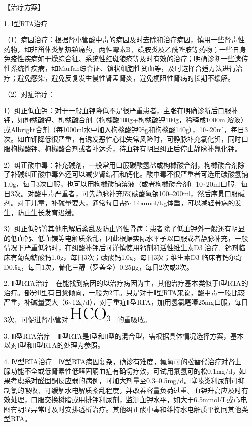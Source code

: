 【治疗方案】

1. Ⅰ型RTA治疗

（1）病因治疗：根据肾小管酸中毒的病因及时去除和治疗病因，慎用一些肾毒性药物，如非甾体类解热镇痛药，两性霉素B，磺胺类及乙酰唑胺等药物；一些自身免疫性疾病如干燥综合征、系统性红斑狼疮等及时有效的治疗；明确诊断一些遗传性系统性疾病，如Marfan综合征、镰状细胞性贫血等，及时选择合适方法进行治疗；避免感染，避免反复发生慢性肾盂肾炎，避免梗阻性肾病的长期不缓解。

（2）对症治疗：

1）纠正低血钾：对于一般血钾降低不是很严重患者，主张在明确诊断后口服补钾，如枸橼酸钾、枸橼酸合剂（枸橼酸100g+枸橼酸钾100g，稀释成1000ml溶液）或Albright合剂（每1000ml水中加入枸橼酸钾98g和枸橼酸140g），10\textasciitilde{}20ml，每日3次。如血钾降低很严重，有诱发恶性心律失常风险时，可静脉补充氯化钾，同时口服枸橼酸钾、枸橼酸合剂或者补达秀，待血钾有明显纠正后停止静脉补氯化钾。

2）纠正酸中毒：补充碱剂，一般常用口服碳酸氢盐或枸橼酸合剂，枸橼酸合剂除了补碱纠正酸中毒外还可以减少肾结石和钙化。酸中毒不很严重者可选用碳酸氢钠1.0g，每日3次口服，也可以用枸橼酸钠溶液（或者枸橼酸合剂）10\textasciitilde{}20ml口服，每日3次。对酸中毒严重者，可先静脉补充5\%碳酸氢钠100\textasciitilde{}200ml，然后序贯口服碱剂。对于儿童，补碱量要大，通常每日需5\textasciitilde{}14mmol/kg体重，可以减轻骨病的发生，防止生长发育迟缓。

3）纠正低钙等其他电解质紊乱及防止肾性骨病：患者除了低血钾外一般还有明显的低血钙、低血镁等电解质紊乱，因此根据实际水平予以口服或者静脉补充，一般情况下严重低钙时，在纠酸补钾后可谨慎使用钙剂和活性维生素D{3}
治疗。钙剂临床有葡萄糖酸钙1.0g，每日3次；碳酸钙1.0g，每日3次；维生素D{3}
临床有钙尔奇D0.6g，每日1次，骨化三醇（罗盖全）0.25μg，每日2次或3次。

2.
Ⅱ型RTA治疗　在能找到病因的以治疗病因为主，其他治疗基本类似于Ⅰ型RTA的治疗。部分Ⅱ型有自愈倾向，一般为2年。只是对于Ⅱ型RTA来说，酸中毒一般比较严重，补碱量要大（6\textasciitilde{}12g/d），对于重症Ⅱ型RTA，加用氢氯噻嗪25mg口服，每日3次，可促进肾小管对\includegraphics{./images/Image00128.jpg}
的重吸收。

3.
Ⅲ型RTA治疗　Ⅲ型RTA是Ⅰ型和Ⅱ型的混合型，需根据具体情况选择方案，基本以对Ⅰ型和Ⅱ型RTA的处理为参照。

4.
Ⅳ型RTA治疗　Ⅳ型RTA病因复杂，确诊有难度，氟氢可的松替代治疗对肾上腺功能不全或低肾素性低醛固酮血症有确切疗效，可试用氟氢可的松0.1mg/d，如果考虑系对醛固酮反应弱的病例，可加大剂量至0.3\textasciitilde{}0.5mg/d。噻嗪类利尿剂可抑制氯的吸收，可缓解水电解质紊乱程度，并改善容量负荷过重。血钾升高应及时有效处理，口服交换树脂或用排钾利尿剂，监测血钾水平，如大于6.5mmol/L或心电图有明显异常时及时安排透析治疗。其他纠正酸中毒和维持水电解质平衡同其他类型RTA。

